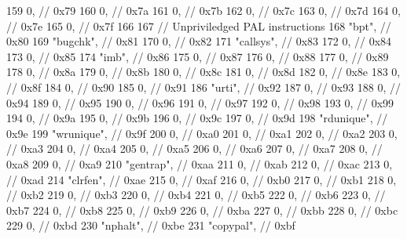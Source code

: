 \begin{DoxyCode}
{{159         0,              // 0x79
160         0,              // 0x7a
161         0,              // 0x7b
162         0,              // 0x7c
163         0,              // 0x7d
164         0,              // 0x7e
165         0,              // 0x7f
166 
167         // Unpriviledged PAL instructions
168         "bpt",          // 0x80
169         "bugchk",       // 0x81
170         0,              // 0x82
171         "callsys",      // 0x83
172         0,              // 0x84
173         0,              // 0x85
174         "imb",          // 0x86
175         0,              // 0x87
176         0,              // 0x88
177         0,              // 0x89
178         0,              // 0x8a
179         0,              // 0x8b
180         0,              // 0x8c
181         0,              // 0x8d
182         0,              // 0x8e
183         0,              // 0x8f
184         0,              // 0x90
185         0,              // 0x91
186         "urti",         // 0x92
187         0,              // 0x93
188         0,              // 0x94
189         0,              // 0x95
190         0,              // 0x96
191         0,              // 0x97
192         0,              // 0x98
193         0,              // 0x99
194         0,              // 0x9a
195         0,              // 0x9b
196         0,              // 0x9c
197         0,              // 0x9d
198         "rdunique",     // 0x9e
199         "wrunique",     // 0x9f
200         0,              // 0xa0
201         0,              // 0xa1
202         0,              // 0xa2
203         0,              // 0xa3
204         0,              // 0xa4
205         0,              // 0xa5
206         0,              // 0xa6
207         0,              // 0xa7
208         0,              // 0xa8
209         0,              // 0xa9
210         "gentrap",      // 0xaa
211         0,              // 0xab
212         0,              // 0xac
213         0,              // 0xad
214         "clrfen",       // 0xae
215         0,              // 0xaf
216         0,              // 0xb0
217         0,              // 0xb1
218         0,              // 0xb2
219         0,              // 0xb3
220         0,              // 0xb4
221         0,              // 0xb5
222         0,              // 0xb6
223         0,              // 0xb7
224         0,              // 0xb8
225         0,              // 0xb9
226         0,              // 0xba
227         0,              // 0xbb
228         0,              // 0xbc
229         0,              // 0xbd
230         "nphalt",       // 0xbe
231         "copypal",      // 0xbf
}}
\end{DoxyCode}
